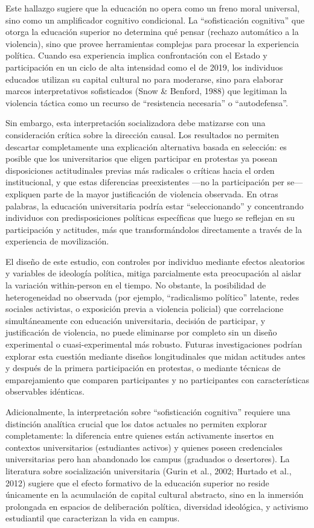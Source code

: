 \documentclass[
  13pt,
]{article}
\begin{document}
Este hallazgo sugiere que la educación no opera como un freno moral
universal, sino como un amplificador cognitivo condicional. La
``sofisticación cognitiva'' que otorga la educación superior no
determina qué pensar (rechazo automático a la violencia), sino que
provee herramientas complejas para procesar la experiencia política.
Cuando esa experiencia implica confrontación con el Estado y
participación en un ciclo de alta intensidad como el de 2019, los
individuos educados utilizan su capital cultural no para moderarse, sino
para elaborar marcos interpretativos sofisticados (Snow \& Benford,
1988) que legitiman la violencia táctica como un recurso de
``resistencia necesaria'' o ``autodefensa''.

Sin embargo, esta interpretación socializadora debe matizarse con una
consideración crítica sobre la dirección causal. Los resultados no
permiten descartar completamente una explicación alternativa basada en
selección: es posible que los universitarios que eligen participar en
protestas ya posean disposiciones actitudinales previas más radicales o
críticas hacia el orden institucional, y que estas diferencias
preexistentes ---no la participación per se--- expliquen parte de la
mayor justificación de violencia observada. En otras palabras, la
educación universitaria podría estar ``seleccionando'' y concentrando
individuos con predisposiciones políticas específicas que luego se
reflejan en su participación y actitudes, más que transformándolos
directamente a través de la experiencia de movilización.

El diseño de este estudio, con controles por individuo mediante efectos
aleatorios y variables de ideología política, mitiga parcialmente esta
preocupación al aislar la variación within-person en el tiempo. No
obstante, la posibilidad de heterogeneidad no observada (por ejemplo,
``radicalismo político'' latente, redes sociales activistas, o
exposición previa a violencia policial) que correlacione simultáneamente
con educación universitaria, decisión de participar, y justificación de
violencia, no puede eliminarse por completo sin un diseño experimental o
cuasi-experimental más robusto. Futuras investigaciones podrían explorar
esta cuestión mediante diseños longitudinales que midan actitudes antes
y después de la primera participación en protestas, o mediante técnicas
de emparejamiento que comparen participantes y no participantes con
características observables idénticas.

Adicionalmente, la interpretación sobre ``sofisticación cognitiva''
requiere una distinción analítica crucial que los datos actuales no
permiten explorar completamente: la diferencia entre quienes están
activamente insertos en contextos universitarios (estudiantes activos) y
quienes poseen credenciales universitarias pero han abandonado los
campus (graduados o desertores). La literatura sobre socialización
universitaria (Gurin et al., 2002; Hurtado et al., 2012) sugiere que el
efecto formativo de la educación superior no reside únicamente en la
acumulación de capital cultural abstracto, sino en la inmersión
prolongada en espacios de deliberación política, diversidad ideológica,
y activismo estudiantil que caracterizan la vida en campus.
\end{document}
